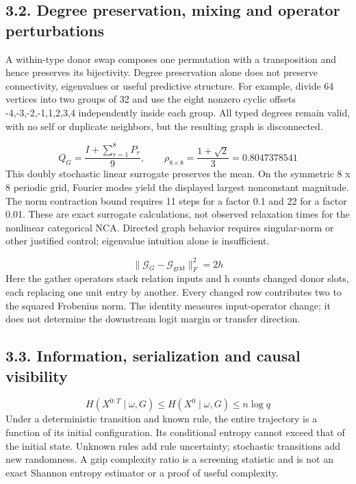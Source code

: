 \documentclass[11pt,a4paper]{article}
\begin{document}
\subsection*{3.2. Degree preservation, mixing and operator perturbations}
A within-type donor swap composes one permutation with a transposition and hence preserves its bijectivity. Degree preservation alone does not preserve connectivity, eigenvalues or useful predictive structure. For example, divide 64 vertices into two groups of 32 and use the eight nonzero cyclic offsets -4,-3,-2,-1,1,2,3,4 independently inside each group. All typed degrees remain valid, with no self or duplicate neighbors, but the resulting graph is disconnected.

\begin{equation}
Q_G=\frac{I+\sum_{r=1}^{8}P_r}{9},\qquad \rho_{8\times8}=\frac{1+\sqrt{2}}{3}=0.8047378541
\end{equation}
This doubly stochastic linear surrogate preserves the mean. On the symmetric 8 x 8 periodic grid, Fourier modes yield the displayed largest nonconstant magnitude. The norm contraction bound requires 11 steps for a factor 0.1 and 22 for a factor 0.01. These are exact surrogate calculations, not observed relaxation times for the nonlinear categorical NCA. Directed graph behavior requires singular-norm or other justified control; eigenvalue intuition alone is insufficient.

\begin{equation}
\|\mathcal{G}_G-\mathcal{G}_{\mathrm{grid}}\|_F^2=2h
\end{equation}
Here the gather operators stack relation inputs and h counts changed donor slots, each replacing one unit entry by another. Every changed row contributes two to the squared Frobenius norm. The identity measures input-operator change; it does not determine the downstream logit margin or transfer direction.

\subsection*{3.3. Information, serialization and causal visibility}
\begin{equation}
H(X^{0:T}\mid\omega,G)\leq H(X^0\mid\omega,G)\leq n\log q
\end{equation}
Under a deterministic transition and known rule, the entire trajectory is a function of its initial configuration. Its conditional entropy cannot exceed that of the initial state. Unknown rules add rule uncertainty; stochastic transitions add new randomness. A gzip complexity ratio is a screening statistic and is not an exact Shannon entropy estimator or a proof of useful complexity.
\end{document}
